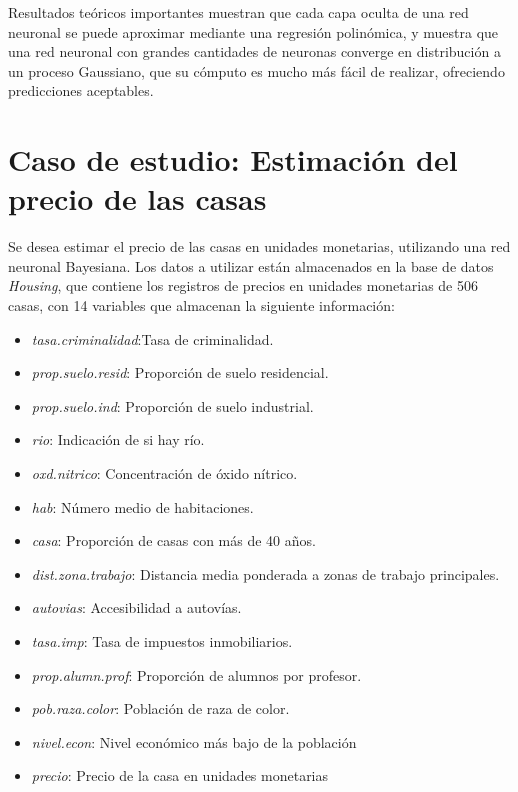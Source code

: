 \documentclass[nojss]{jss}
\begin{document}
Resultados teóricos importantes \cite{Cheng2018} muestran que cada capa oculta de una red neuronal se puede aproximar mediante una regresión polinómica, y \cite{Williams1996} muestra que una red neuronal con grandes cantidades de neuronas converge en distribución a un proceso Gaussiano, que su cómputo es mucho más fácil de realizar, ofreciendo predicciones aceptables.
  
\section{Caso de estudio: Estimaci\'on del precio de las casas}  

Se desea estimar el precio de las casas en unidades monetarias, utilizando una red neuronal Bayesiana. Los datos a utilizar están almacenados en la base de datos \textit{Housing}, que contiene los registros de precios en unidades monetarias de 506 casas, con 14 variables que almacenan la siguiente información:

\begin{itemize}
	\item \textit{tasa.criminalidad}:Tasa de criminalidad.
	\item \textit{prop.suelo.resid}: Proporción de suelo residencial.
	\item \textit{prop.suelo.ind}: Proporción de suelo industrial.	
	\item \textit{rio}: Indicación de si hay río.
	\item \textit{oxd.nitrico}: Concentración de óxido nítrico.
	\item \textit{hab}: Número medio de habitaciones.
	\item \textit{casa}: Proporción de casas con más de 40 años.
	\item \textit{dist.zona.trabajo}: Distancia media ponderada a zonas de trabajo principales.
	\item \textit{autovias}: Accesibilidad a autovías. 
	\item \textit{tasa.imp}: Tasa de impuestos inmobiliarios.
	\item \textit{prop.alumn.prof}: Proporción de alumnos por profesor.
	\item \textit{pob.raza.color}: Población de raza de color.
	\item \textit{nivel.econ}: Nivel económico más bajo de la población
	\item \textit{precio}: Precio de la casa en unidades monetarias
\end{itemize}
\end{document}
